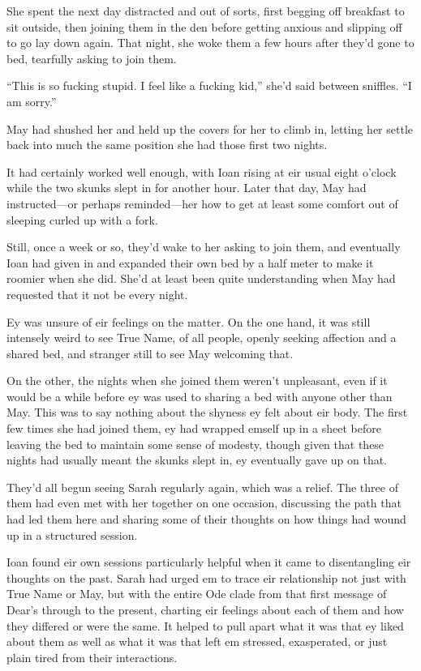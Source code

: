 She spent the next day distracted and out of sorts, first begging off breakfast to sit outside, then joining them in the den before getting anxious and slipping off to go lay down again. That night, she woke them a few hours after they'd gone to bed, tearfully asking to join them.

``This is so fucking stupid. I feel like a fucking kid,'' she'd said between sniffles. ``I am sorry.''

May had shushed her and held up the covers for her to climb in, letting her settle back into much the same position she had those first two nights.

It had certainly worked well enough, with Ioan rising at eir usual eight o'clock while the two skunks slept in for another hour. Later that day, May had instructed—or perhaps reminded—her how to get at least some comfort out of sleeping curled up with a fork.

Still, once a week or so, they'd wake to her asking to join them, and eventually Ioan had given in and expanded their own bed by a half meter to make it roomier when she did. She'd at least been quite understanding when May had requested that it not be every night.

Ey was unsure of eir feelings on the matter. On the one hand, it was still intensely weird to see True Name, of all people, openly seeking affection and a shared bed, and stranger still to see May welcoming that.

On the other, the nights when she joined them weren't unpleasant, even if it would be a while before ey was used to sharing a bed with anyone other than May. This was to say nothing about the shyness ey felt about eir body. The first few times she had joined them, ey had wrapped emself up in a sheet before leaving the bed to maintain some sense of modesty, though given that these nights had usually meant the skunks slept in, ey eventually gave up on that.

They'd all begun seeing Sarah regularly again, which was a relief. The three of them had even met with her together on one occasion, discussing the path that had led them here and sharing some of their thoughts on how things had wound up in a structured session.

Ioan found eir own sessions particularly helpful when it came to disentangling eir thoughts on the past. Sarah had urged em to trace eir relationship not just with True Name or May, but with the entire Ode clade from that first message of Dear's through to the present, charting eir feelings about each of them and how they differed or were the same. It helped to pull apart what it was that ey liked about them as well as what it was that left em stressed, exasperated, or just plain tired from their interactions.

